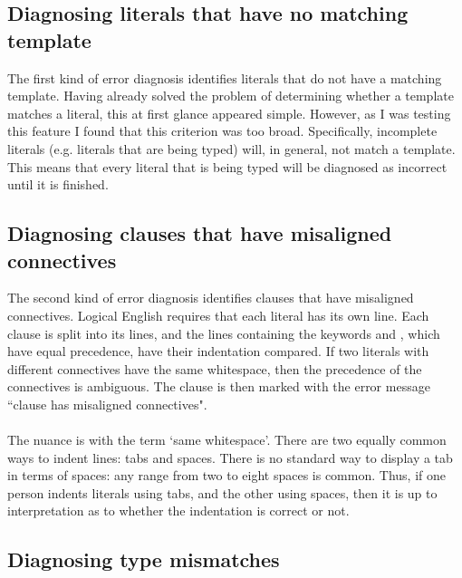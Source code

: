 \documentclass[../main.tex]{subfiles}
\begin{document}
\subsection{Diagnosing literals that have no matching template}
The first kind of error diagnosis identifies literals that do not have a matching template. Having already solved the problem of determining whether a template matches a literal, this at first glance appeared simple.
However, as I was testing this feature I found that this criterion was too broad. Specifically, incomplete literals (e.g. literals that are being typed) will, in general, not match a template. This means that every literal that is being typed will be diagnosed as incorrect until it is finished.

\subsection{Diagnosing clauses that have misaligned connectives}
The second kind of error diagnosis identifies clauses that have misaligned connectives. Logical English requires that each literal has its own line. Each clause is split into its lines, and the lines containing the keywords  and , which have equal precedence, have their indentation compared. If two literals with different connectives have the same whitespace, then the precedence of the connectives is ambiguous. The clause is then marked with the error message ``clause has misaligned connectives".
\\
\\
The nuance is with the term `same whitespace'. There are two equally common ways to indent lines: tabs and spaces. There is no standard way to display a tab in terms of spaces: any range from two to eight spaces is common. Thus, if one person indents literals using tabs, and the other using spaces, then it is up to interpretation as to whether the indentation is correct or not.

\subsection{Diagnosing type mismatches}
\end{document}
